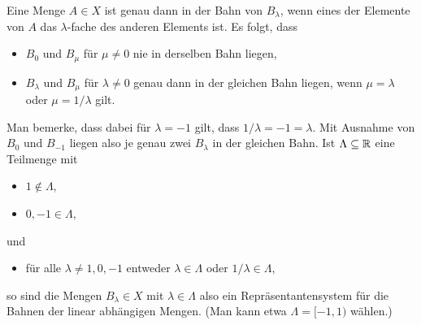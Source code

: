 \begin{itemize}
    Eine Menge $A \in X$ ist genau dann in der Bahn von $B_\lambda$, wenn eines der Elemente von $A$ das $\lambda$-fache des anderen Elements ist.
    Es folgt, dass
    \begin{itemize}
      \item
        $B_0$ und $B_\mu$ für $\mu \neq 0$ nie in derselben Bahn liegen,
      \item
        $B_\lambda$ und $B_\mu$ für $\lambda \neq 0$ genau dann in der gleichen Bahn liegen, wenn $\mu = \lambda$ oder $\mu = 1/\lambda$ gilt.
    \end{itemize}
    Man bemerke, dass dabei für $\lambda = -1$ gilt, dass $1/\lambda = -1 = \lambda$.
    Mit Ausnahme von $B_0$ und $B_{-1}$ liegen also je genau zwei $B_\lambda$ in der gleichen Bahn.
    Ist $\Lambda \subseteq \mathbb{R}$ eine Teilmenge mit
    \begin{itemize}
      \item
        $1 \notin \Lambda$,
      \item
        $0, -1 \in \Lambda$,
    \end{itemize}
    und
    \begin{itemize}[resume]
      \item
        für alle $\lambda \neq 1, 0, -1$ entweder $\lambda \in \Lambda$ oder $1/\lambda \in \Lambda$,
    \end{itemize}
    so  sind die Mengen $B_\lambda \in X$ mit $\lambda \in \Lambda$ also ein Repräsentantensystem für die Bahnen der linear abhängigen Mengen.
    (Man kann etwa $\Lambda = [-1, 1)$ wählen.)
    

\end{itemize}
